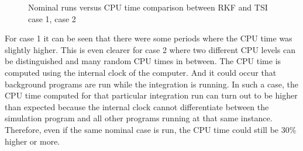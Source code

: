 \begin{figure}[H]
\centering
{} 
\caption{Nominal runs versus CPU time comparison between \ac{RKF} and \ac{TSI} \protect{} case 1,  \protect{} case 2 } 
\label{fig:multiRunVsCPUcase1RKFTSIsmall} 
\end{figure} 

For case 1 it can be seen that there were some periods where the CPU time was slightly higher. This is even clearer for case 2 where two different CPU levels can be distinguished and many random CPU times in between. The CPU time is computed using the internal clock of the computer. And it could occur that background programs are run while the integration is running. In such a case, the CPU time computed for that particular integration run can turn out to be higher than expected because the internal clock cannot differentiate between the simulation program and all other programs running at that same instance. Therefore, even if the same nominal case is run, the CPU time could still be 30\% higher or more. 


